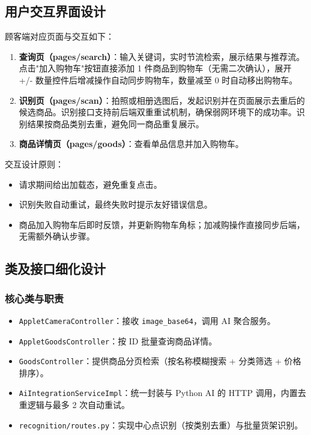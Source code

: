 \subsection{用户交互界面设计}
顾客端对应页面与交互如下：
\begin{enumerate}[leftmargin=2em]
  \item \textbf{查询页（pages/search）}：输入关键词，实时节流检索，展示结果与推荐流。点击"加入购物车"按钮直接添加 1 件商品到购物车（无需二次确认），展开 +/- 数量控件后增减操作自动同步购物车，数量减至 0 时自动移出购物车。
  \item \textbf{识别页（pages/scan）}：拍照或相册选图后，发起识别并在页面展示去重后的候选商品。识别接口支持前后端双重重试机制，确保弱网环境下的成功率。识别结果按商品类别去重，避免同一商品重复展示。
  \item \textbf{商品详情页（pages/goods）}：查看单品信息并加入购物车。
\end{enumerate}

交互设计原则：
\begin{itemize}[leftmargin=2em]
  \item 请求期间给出加载态，避免重复点击。
  \item 识别失败自动重试，最终失败时提示友好错误信息。
  \item 商品加入购物车后即时反馈，并更新购物车角标；加减购操作直接同步后端，无需额外确认步骤。
\end{itemize}

\subsection{类及接口细化设计}

\subsubsection{核心类与职责}
\begin{itemize}[leftmargin=2em]
  \item \texttt{AppletCameraController}：接收 \texttt{image\_base64}，调用 AI 聚合服务。
  \item \texttt{AppletGoodsController}：按 ID 批量查询商品详情。
  \item \texttt{GoodsController}：提供商品分页检索（按名称模糊搜索 + 分类筛选 + 价格排序）。
  \item \texttt{AiIntegrationServiceImpl}：统一封装与 Python AI 的 HTTP 调用，内置去重逻辑与最多 2 次自动重试。
  \item \texttt{recognition/routes.py}：实现中心点识别（按类别去重）与批量货架识别。
\end{itemize}

